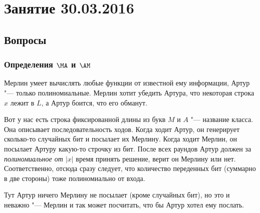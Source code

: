 \chapter{Занятие 30.03.2016}

\section{Вопросы}
\subsection{Определения $\MA$ и $\AM$}
	Мерлин умеет вычислять любые
	функции от известной ему информации, Артур "--- только полиномиальные.
	Мерлин хотит убедить Артура, что некоторая строка $x$ лежит в $L$, а Артур боится, что его обманут.

	Вот у нас есть строка фиксированной длины из букв $M$ и $A$ "--- название класса.
	Она описывает последовательность ходов.
	Когда ходит Артур, он генерирует сколько-то случайных бит и посылает их Мерлину.
	Когда ходит Мерлин, он посылает Артуру какую-то строчку из бит.
	После всех раундов Артур должен за \textit{полиномиальное от $|x|$} время принять решение, верит он Мерлину или нет.
	Соответственно, отсюда сразу следует, что количество переденных бит (суммарно в две стороны)
	тоже полиномиально от входа.
	
	Тут Артур ничего Мерлину не посылает (кроме случайных бит), но это и
	неважно "--- Мерлин и так может посчитать, что бы Артур хотел ему послать.

